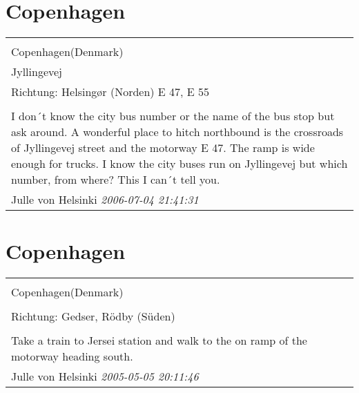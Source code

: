 \documentclass[a4paper,12pt]{article}
\begin{document}
\section{Copenhagen}
\begin{tabular}{|p{13cm}|}
\hline\\
Copenhagen(Denmark)\\
Jyllingevej\\
Richtung: Helsingør (Norden) E 47, E 55 \\
\hline\\
I don´t know the city bus number or the name of the bus stop but ask around. A wonderful place to hitch northbound is the crossroads of Jyllingevej street and the motorway E 47. The ramp is wide enough for trucks. I know the city buses run on Jyllingevej but which number, from where? This I can´t tell you. \\
Julle von Helsinki \textit{ 2006-07-04 21:41:31 }\\\hline
\end{tabular}


\section{Copenhagen}
\begin{tabular}{|p{13cm}|}
\hline\\
Copenhagen(Denmark)\\
\\
Richtung: Gedser, Rödby (Süden) \\
\hline\\
Take a train to Jersei station and walk to the on ramp of the motorway heading south. \\
Julle von Helsinki \textit{ 2005-05-05 20:11:46 }\\\hline
\end{tabular}
\end{document}
